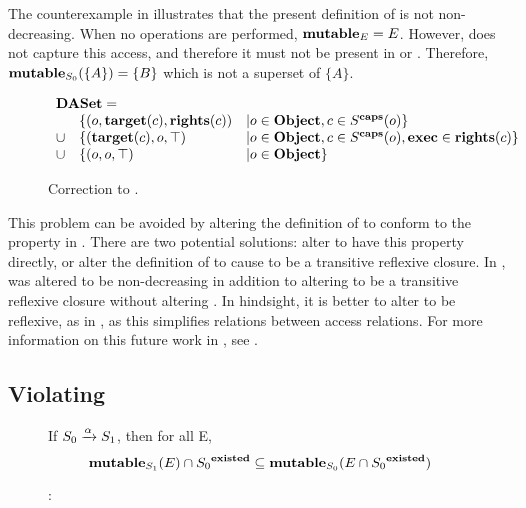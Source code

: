 The counterexample in  illustrates that the present definition of \mutable{} is not non-decreasing.
When no operations are performed, \(\mathbf{mutable}_{E} = E\).
However, \daset{} does not capture this access, and therefore it must not be present in  or .
Therefore, \(\mathbf{mutable}_{S_0}(\{A\}) = \{B\}\) which is not a superset of \(\{A\}\).

\begin{figure}
  \[
  \begin{array}{rll}
    \multicolumn{3}{l}{\daset =} \\
    & \{(o,\target{c},\rights{c}) & | o \in \objectset, c \in \capsetapp{S}{o}\} \\
    \cup & \{(\target{c},o, \allrights) & | o \in \objectset, c \in \capsetapp{S}{o}, \execright \in \rights{c} \} \\
    \cup & \{(o,o, \allrights) & | o \in \objectset \} \\  
  \end{array}
  \]
  \caption{Correction to \daset{}. \label{def:SW:fix:DASet}}
\end{figure}


This problem can be avoided by altering the definition of \mutable{} to conform to the property in .
There are two potential solutions: alter \mutable{} to have this property directly, or alter the definition of \daset{} to cause \potacc{} to be a transitive reflexive closure.
In \TMmodelName{}, \mutable{} was altered to be non-decreasing in addition to altering \potacc{} to be a transitive reflexive closure without altering \daset{}.
In hindsight, it is better to alter \diracc{} to be reflexive, as in , as this simplifies relations between access relations.
For more information on this future work in \TMmodelName{}, see .

\subsection{Violating \thmauthred{}}
\label{sec:SW:authred}

\begin{figure}
If \( S_0 \xrightarrow {\alpha} S_1 \), then for all E,
\[ \mathbf{mutable}_{S_1}(E) \cap {S_0}^{\mathbf{existed}} \subseteq \mathbf{mutable}_{S_0}(E \cap {S_0}^{\mathbf{existed}}) \]
\caption{\modellbl{} : \thmauthred{} \label{def:SW:auth_red}}
\end{figure}

